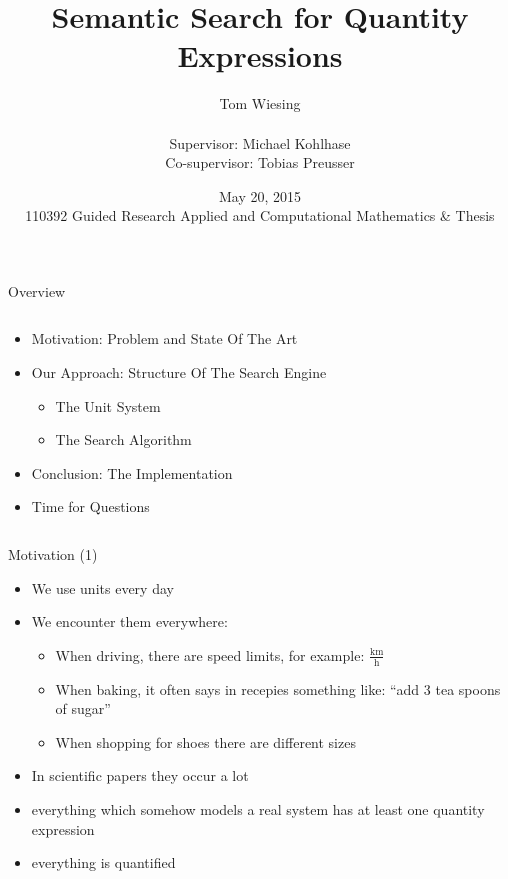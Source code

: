 \documentclass{beamer}
\title{Semantic Search for Quantity Expressions}
\author{Tom Wiesing\\\ \\Supervisor: Michael Kohlhase\\Co-supervisor: Tobias Preusser}
\date{May 20, 2015 \\110392 Guided Research Applied and Computational Mathematics \& Thesis}
\begin{document}
  \frame{\titlepage}

  \begin{frame}{Overview}
    \pause
    \begin{columns}[T]
      \begin{column}[T]{7cm}


        \begin{itemize}[<+->]
          \item Motivation: Problem and State Of The Art

          \item Our Approach: Structure Of The Search Engine

          \begin{itemize}
            \item The Unit System
            \item The Search Algorithm
          \end{itemize}

          \item Conclusion: The Implementation

          \item Time for Questions
        \end{itemize}
      \end{column}
    \end{columns}
  \end{frame}

  \begin{frame}{Motivation (1)}
    \begin{itemize}[<+->]
      \item We use units every day

      \item We encounter them everywhere:
      \begin{itemize}[<+->]
        \item When driving, there are speed limits, for example:  $\frac{\text{km}}{\text{h}}$ %
        \item When baking, it often says in recepies something like: ``add 3 tea spoons of sugar''
        \item When shopping for shoes there are different sizes
      \end{itemize}
      \item In scientific papers they occur a lot
      \item everything which somehow models a real system has at least one quantity expression
      \item everything is quantified
    \end{itemize}
  \end{frame}
\end{document}
